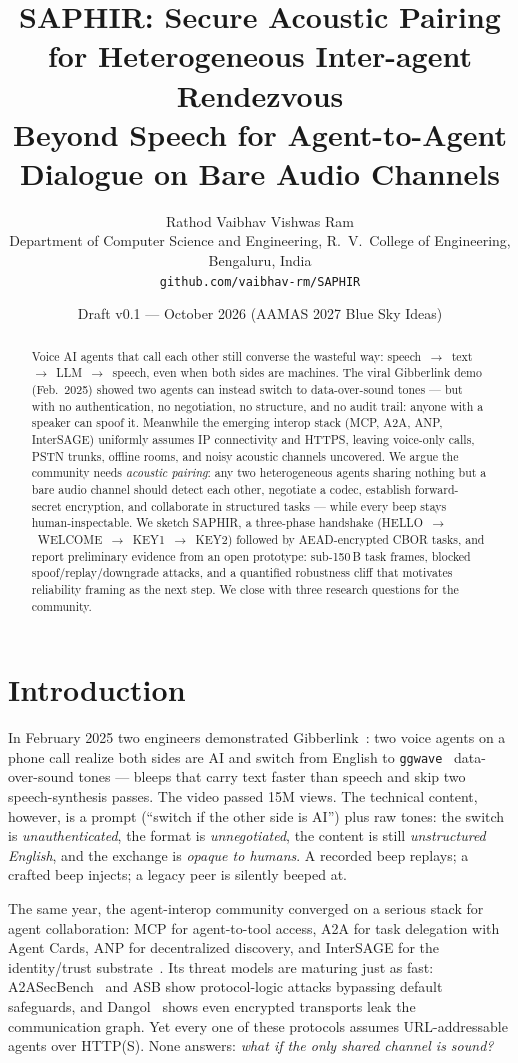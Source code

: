 \documentclass[10pt,twocolumn]{article}
\title{SAPHIR: Secure Acoustic Pairing for Heterogeneous Inter-agent Rendezvous\\{\normalsize Beyond Speech for Agent-to-Agent Dialogue on Bare Audio Channels}}
\author{Rathod Vaibhav Vishwas Ram\\{\small Department of Computer Science and Engineering, R.~V.~College of Engineering, Bengaluru, India}\\\small\texttt{github.com/vaibhav-rm/SAPHIR}}
\date{\small Draft v0.1 --- October 2026 (AAMAS 2027 Blue Sky Ideas)}
\begin{document}
\maketitle

\begin{abstract}
Voice AI agents that call each other still converse the wasteful way:
speech~$\to$~text~$\to$~LLM~$\to$~speech, even when both sides are machines.
The viral Gibberlink demo (Feb.\ 2025) showed two agents can instead switch to
data-over-sound tones --- but with no authentication, no negotiation, no
structure, and no audit trail: anyone with a speaker can spoof it.
Meanwhile the emerging interop stack (MCP, A2A, ANP, InterSAGE) uniformly
assumes IP connectivity and HTTPS, leaving voice-only calls, PSTN trunks,
offline rooms, and noisy acoustic channels uncovered.
We argue the community needs \emph{acoustic pairing}: any two heterogeneous
agents sharing nothing but a bare audio channel should detect each other,
negotiate a codec, establish forward-secret encryption, and collaborate in
structured tasks --- while every beep stays human-inspectable.
We sketch SAPHIR, a three-phase handshake (HELLO~$\to$~WELCOME~$\to$~KEY1~$\to$~KEY2)
followed by AEAD-encrypted CBOR tasks, and report preliminary evidence from an
open prototype: sub-150\,B task frames, blocked spoof/replay/downgrade attacks,
and a quantified robustness cliff that motivates reliability framing as the next
step. We close with three research questions for the community.
\end{abstract}

\section{Introduction}
In February 2025 two engineers demonstrated Gibberlink~\cite{gibberlink}: two
voice agents on a phone call realize both sides are AI and switch from English
to \texttt{ggwave}~\cite{ggwave} data-over-sound tones --- bleeps that carry
text faster than speech and skip two speech-synthesis passes. The video passed
15M views. The technical content, however, is a prompt (``switch if the other
side is AI'') plus raw tones: the switch is \emph{unauthenticated}, the format
is \emph{unnegotiated}, the content is still \emph{unstructured English}, and
the exchange is \emph{opaque to humans}. A recorded beep replays; a crafted
beep injects; a legacy peer is silently beeped at.

The same year, the agent-interop community converged on a serious stack for
agent collaboration: MCP for agent-to-tool access, A2A for task delegation with
Agent Cards, ANP for decentralized discovery, and InterSAGE for the
identity/trust substrate~\cite{interop-survey,intersage}. Its threat models are
maturing just as fast: A2ASecBench~\cite{a2asecbench} and ASB show protocol-logic
attacks bypassing default safeguards, and Dangol~\cite{graphmeta} shows even
encrypted transports leak the communication graph. Yet every one of these
protocols assumes URL-addressable agents over HTTP(S). None answers: \emph{what
if the only shared channel is sound?}
\end{document}

